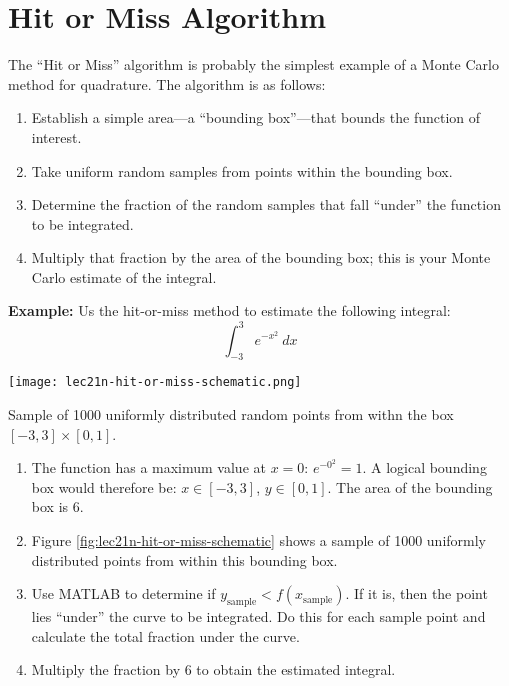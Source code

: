 \section{Hit or Miss Algorithm}
The ``Hit or Miss'' algorithm is probably the simplest example of a Monte Carlo method for quadrature.  The algorithm is as follows:
\begin{enumerate}
\item Establish a simple area---a ``bounding box''---that bounds the function of interest.
\item Take uniform random samples from points within the bounding box.
\item Determine the fraction of the random samples that fall ``under'' the function to be integrated.
\item Multiply that fraction by the area of the bounding box; this is your Monte Carlo estimate of the integral.
\end{enumerate}

\vspace{0.25cm}

\noindent\textbf{Example:} Us the hit-or-miss method to estimate the following integral:
\begin{equation*}
\int_{-3}^{3} e^{-x^2} \ dx
\end{equation*}

\begin{marginfigure}
\texttt{[image: lec21n-hit-or-miss-schematic.png]}
\caption{Sample of 1000 uniformly distributed random points from withn the box $[-3,3]\times[0,1]$.}
\label{fig:lec21n-hit-or-miss-schematic}
\end{marginfigure}

\begin{enumerate}
\item The function has a maximum value at $x=0$: $e^{-0^2} = 1$.  A logical bounding box would therefore be: $x \in [-3,3]$, $y \in [0,1]$.  The area of the bounding box is 6.

\item Figure \ref{fig:lec21n-hit-or-miss-schematic} shows a sample of 1000 uniformly distributed points from within this bounding box.

\item Use MATLAB to determine if $y_{\text{sample}} < f(x_{\text{sample}})$.  If it is, then the point lies ``under'' the curve to be integrated.  Do this for each sample point and calculate the total fraction under the curve.

\item Multiply the fraction by 6 to obtain the estimated integral.
\end{enumerate}

